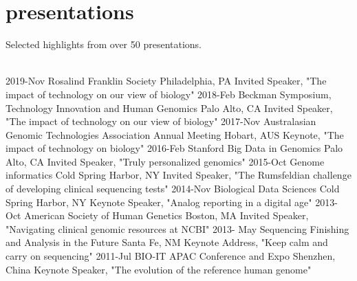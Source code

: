 \documentclass[]{dmc-cv} %
\begin{document}
\section{presentations}
Selected highlights from over 50 presentations.\\
\\
\begin{entrylist}
\entry
{2019-Nov}
{Rosalind Franklin Society}
{Philadelphia, PA}
{Invited Speaker, "The impact of technology on our view of biology"}
\entry
{2018-Feb}
{Beckman Symposium, Technology Innovation and Human Genomics}
{Palo Alto, CA}
{Invited Speaker, "The impact of technology on our view of biology"}
\entry
{2017-Nov}
{Australasian Genomic Technologies Association Annual Meeting}
{Hobart, AUS}
{Keynote, "The impact of technology on biology"}
\entry
{2016-Feb}
{Stanford Big Data in Genomics}
{Palo Alto, CA}
{Invited Speaker, "Truly personalized genomics"}
\entry
{2015-Oct}
{Genome informatics}
{Cold Spring Harbor, NY}
{Invited Speaker, "The Rumsfeldian challenge of developing clinical sequencing tests"}
\entry
{2014-Nov}
{Biological Data Sciences}
{Cold Spring Harbor, NY}
{Keynote Speaker, "Analog reporting in a digital age"}
\entry
{2013-Oct}
{American Society of Human Genetics}
{Boston, MA}
{Invited Speaker, "Navigating clinical genomic resources at NCBI"}
\entry
{2013- May}
{Sequencing Finishing and Analysis in the Future}
{Santa Fe, NM}
{Keynote Address, "Keep calm and carry on sequencing"}
\entry
{2011-Jul}
{BIO-IT APAC Conference and Expo}
{Shenzhen, China}
{Keynote Speaker, "The evolution of the reference human genome"}

\end{entrylist}

\end{document}
